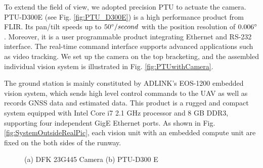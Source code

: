 To extend the field of view, we adopted precision PTU to actuate the camera. PTU-D300E (see Fig. \ref{fig:PTU_D300E}) is a high performance product from FLIR. Its pan/tilt speeds up to $50\degree/second$ with the position resolution of $0.006\degree$. Moreover, it is a user programmable product integrating Ethernet  and RS-232 interface. The real-time command interface supports advanced applications such as video tracking. We set up the camera on the top bracketing, and the assembled individual vision system is illustrated in Fig. \ref{fig:PTUwithCamera}. 

The ground station is mainly constituted by ADLINK's EOS-1200 embedded vision system, which sends high level control commands to the UAV as well as records  GNSS data and estimated data.  This product is a rugged and compact system equipped with Intel Core i7 2.1 GHz processor and 8 GB DDR3, supporting four independent GigE Ethernet ports. As shown in Fig. \ref{fig:SystemOutsideRealPic}, each vision unit with an embedded compute unit are fixed on the both sides of the runway.

\begin{figure}[!tb]
	\centering
	\caption{(a) DFK 23G445 Camera (b) PTU-D300 E}
\end{figure}

